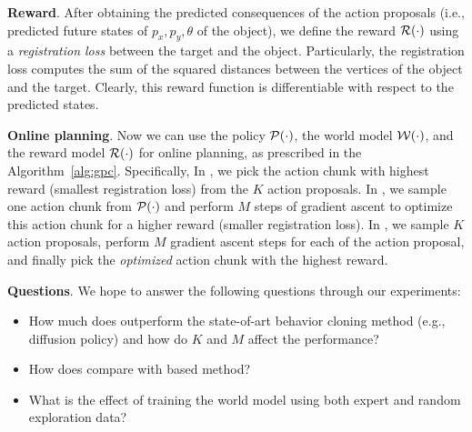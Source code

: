 \textbf{Reward}. After obtaining the predicted consequences of the action proposals (i.e., predicted future states of $p_x, p_y, \theta$ of the object), we define the reward ${\cal R}(\cdot)$ using a \emph{registration loss} between the target and the object. Particularly, the registration loss computes the sum of the squared distances between the vertices of the object and the target. Clearly, this reward function is differentiable with respect to the predicted states. 

\textbf{Online planning}. Now we can use the policy ${\cal P}(\cdot)$, the world model ${\cal W}(\cdot)$, and the reward model ${\cal R}(\cdot)$ for online planning, as prescribed in the \nameshort Algorithm~\ref{alg:gpc}. Specifically, In \gpcrank, we pick the action chunk with highest reward (smallest registration loss) from the $K$ action proposals. In \gpcopt, we sample one action chunk from ${\cal P}(\cdot)$ and perform $M$ steps of gradient ascent to optimize this action chunk for a higher reward (smaller registration loss). In \gpcrankopt, we sample $K$ action proposals, perform $M$ gradient ascent steps for each of the action proposal, and finally pick the \emph{optimized} action chunk with the highest reward.

\textbf{Questions}. We hope to answer the following questions through our experiments:
\begin{itemize}
    \item How much does \nameshort outperform the state-of-art behavior cloning method (e.g., diffusion policy) and how do $K$ and $M$ affect the performance? 
    \item How does \nameshort compare with \offlinerl based method? 
    \item What is the effect of training the world model using both expert and random exploration data?
\end{itemize}

